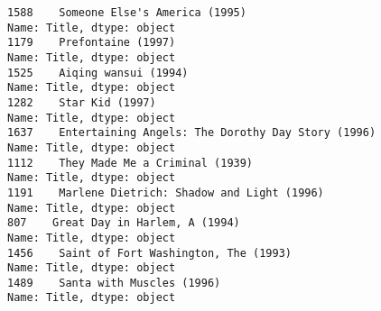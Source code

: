 \documentclass[11pt]{article}
\begin{document}
    \begin{Verbatim}[commandchars=\\\{\}]
1588    Someone Else's America (1995)
Name: Title, dtype: object
1179    Prefontaine (1997)
Name: Title, dtype: object
1525    Aiqing wansui (1994)
Name: Title, dtype: object
1282    Star Kid (1997)
Name: Title, dtype: object
1637    Entertaining Angels: The Dorothy Day Story (1996)
Name: Title, dtype: object
1112    They Made Me a Criminal (1939)
Name: Title, dtype: object
1191    Marlene Dietrich: Shadow and Light (1996) 
Name: Title, dtype: object
807    Great Day in Harlem, A (1994)
Name: Title, dtype: object
1456    Saint of Fort Washington, The (1993)
Name: Title, dtype: object
1489    Santa with Muscles (1996)
Name: Title, dtype: object

    \end{Verbatim}

    \begin{center}
    \end{center}
    { \hspace*{\fill} \\}
    
    \begin{center}
    \end{center}
    { \hspace*{\fill} \\}
    
\end{document}
